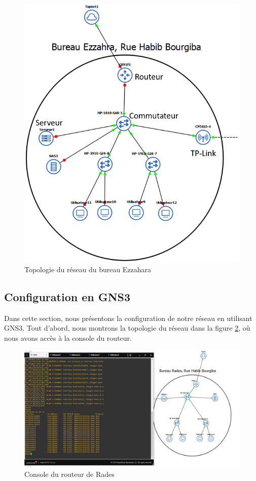 \begin{figure}[H]
\centering
\includegraphics[width=15cm]{Images/BEzzahra-Topologie.png}
\caption{Topologie du réseau du bureau Ezzahara}
\label{Chap2.5.1}
\end{figure}



\subsection{Configuration en GNS3}

Dans cette section, nous présentons la configuration de notre réseau en utilisant GNS3. Tout d'abord, nous montrons la topologie du réseau dans la figure \ref{Chap2.2.1}, où nous avons accès à la console du routeur. 


\begin{figure}[H]
 \centering
    \includegraphics[width=16cm]{Images/BRades-Topologie1.png}
    \caption{Console du routeur de Rades}
    \label{Chap2.2.1}
\end{figure}


